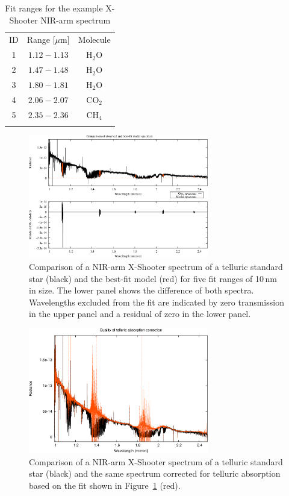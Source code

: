 \begin{table}
\caption[]{Fit ranges for the example X-Shooter NIR-arm spectrum}
\label{tab:fitranges}
\centering
\vspace{5pt}
\begin{tabular}{c c c}
\hline\hline
\noalign{\smallskip}
ID & Range [$\mu$m] & Molecule \\
\noalign{\smallskip}
\hline
\noalign{\smallskip}
1 & $1.12 - 1.13$ & H$_2$O \\
2 & $1.47 - 1.48$ & H$_2$O \\
3 & $1.80 - 1.81$ & H$_2$O \\
4 & $2.06 - 2.07$ & CO$_2$ \\
5 & $2.35 - 2.36$ & CH$_4$ \\
\noalign{\smallskip}
\hline
\end{tabular}
\end{table}

\begin{figure}
\centering
\includegraphics[width=0.7\textwidth,clip=true]
{figures/molecfit_xshoo_tellstd_nir_fit.pdf}
\caption[]{Comparison of a NIR-arm X-Shooter spectrum of a telluric standard
star (black) and the best-fit model (red) for five fit ranges of 10\,nm in
size. The lower panel shows the difference of both spectra. Wavelengths
excluded from the fit are indicated by zero transmission in the upper panel
and a residual of zero in the lower panel.}
\label{fig:xsh_fit}
\end{figure}

\begin{figure}
\centering
\includegraphics[width=0.7\textwidth,clip=true]
{figures/molecfit_xshoo_tellstd_nir_tac.pdf}
\caption[]{Comparison of a NIR-arm X-Shooter spectrum of a telluric standard
star (black) and the same spectrum corrected for telluric absorption based on
the fit shown in Figure~\ref{fig:xsh_fit} (red).}
\label{fig:xsh_tac}
\end{figure}

